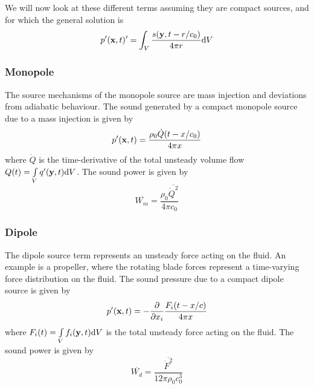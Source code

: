 
We will now look at these different terms assuming they are compact sources, and for which
the general solution is
\begin{equation}
  p'(\mathbf{x}, t)' = \int_V \frac{s(\mathbf{y}, t-r/c_0)}{4\pi r} \mathrm{d} V
\end{equation}

\subsubsection*{Monopole}
The source mechanisms of the monopole source are mass injection and deviations
from adiabatic behaviour. The sound generated by a compact monopole source due to a mass injection is given by
\begin{equation}
  p'(\mathbf{x}, t) = \frac{\rho_0 \dot{Q} (t-x/c_0)}{4 \pi x}
\end{equation}
where $\dot{Q}$ is the time-derivative of the total unsteady volume flow
$Q(t) = \int\limits_V q'(\mathbf{y},t) \mathrm{d}V$.
The sound power is given by
\begin{equation}
  \overline{W_m} = \frac{\rho_0 \overline{\dot{Q}^2}}{4 \pi c_0}
\end{equation}

\subsubsection*{Dipole}
The dipole source term represents an unsteady force
acting on the fluid. An example is a propeller, where the rotating blade forces represent a time-varying force distribution on the fluid.
The sound pressure due to a compact dipole source is given by
\begin{equation}
  p'(\mathbf{x}, t) = - \frac{\partial}{\partial x_i} \frac{F_i (t-x/c)}{4 \pi x}
\end{equation}
where $F_i(t) = \int\limits_V f_i(\mathbf{y},t) \mathrm{d}V$ is the total unsteady force acting on the fluid.
The sound power is given by
\begin{equation}
  \overline{W_d} = \frac{\overline{\dot{F}^2}}{12 \pi \rho_0 c_0^3}
\end{equation}

